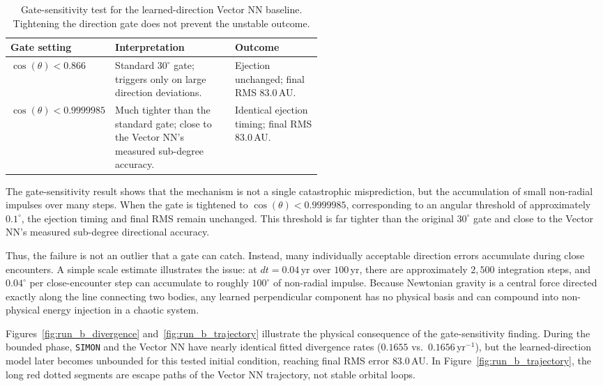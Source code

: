 \documentclass[12pt]{article}
\begin{document}
\begin{table}[H]
\centering
\caption{Gate-sensitivity test for the learned-direction Vector NN baseline. Tightening the direction gate does not prevent the unstable outcome.}
\label{tab:vector_gate_sensitivity}
\begin{tabularx}{\linewidth}{
    >{\raggedright\arraybackslash}p{0.24\linewidth}
    >{\raggedright\arraybackslash}X
    >{\raggedright\arraybackslash}p{0.28\linewidth}
}
\toprule
\textbf{Gate setting} & \textbf{Interpretation} & \textbf{Outcome} \\
\midrule
$\cos(\theta) < 0.866$
&
Standard $30^\circ$ gate; triggers only on large direction deviations.
&
Ejection unchanged; final RMS $83.0$\,AU.
\\
\addlinespace
$\cos(\theta) < 0.9999985$
&
Much tighter than the standard gate; close to the Vector NN's measured sub-degree accuracy.
&
Identical ejection timing; final RMS $83.0$\,AU.
\\
\bottomrule
\end{tabularx}
\end{table}

The gate-sensitivity result shows that the mechanism is not a single catastrophic misprediction, but the accumulation of small non-radial impulses over many steps. When the gate is tightened to $\cos(\theta) < 0.9999985$, corresponding to an angular threshold of approximately $0.1^\circ$, the ejection timing and final RMS remain unchanged. This threshold is far tighter than the original $30^\circ$ gate and close to the Vector NN's measured sub-degree directional accuracy. 

Thus, the failure is not an outlier that a gate can catch. Instead, many individually acceptable direction errors accumulate during close encounters. A simple scale estimate illustrates the issue: at $dt = 0.04$\,yr over $100$\,yr, there are approximately $2{,}500$ integration steps, and $0.04^\circ$ per close-encounter step can accumulate to roughly $100^\circ$ of non-radial impulse. Because Newtonian gravity is a central force directed exactly along the line connecting two bodies, any learned perpendicular component has no physical basis and can compound into non-physical energy injection in a chaotic system.

Figures~\ref{fig:run_b_divergence} and~\ref{fig:run_b_trajectory} illustrate the physical consequence of the gate-sensitivity finding. During the bounded phase, \texttt{SIMON} and the Vector NN have nearly identical fitted divergence rates ($0.1655$ vs.\ $0.1656$\,yr$^{-1}$), but the learned-direction model later becomes unbounded for this tested initial condition, reaching final RMS error $83.0$\,AU. In Figure~\ref{fig:run_b_trajectory}, the long red dotted segments are escape paths of the Vector NN trajectory, not stable orbital loops.
\end{document}
